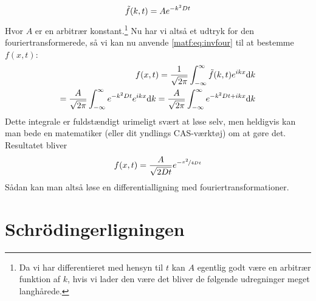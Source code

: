 \documentclass[crop=false, class=memoir]{standalone}
\begin{document}
\begin{align}
    \Tilde{f}(k,t) = Ae^{-k^2 D t}
\end{align}
Hvor $A$ er en arbitrær konstant.\footnote{Da vi har differentieret med hensyn til $t$ kan $A$ egentlig godt være en arbitrær funktion af $k$, hvis vi lader den være det bliver de følgende udregninger meget langhårede.} Nu har vi altså et udtryk for den fouriertransformerede, så vi kan nu anvende \cref{matf:eq:invfour} til at bestemme $f(x,t)$:
\begin{align}
    f(x,t) = \frac{1}{\sqrt{2\pi}}\int_{-\infty}^{\infty} \Tilde{f}(k,t) e^{ikx} \dd k \\
    = \frac{A}{\sqrt{2\pi}}\int_{-\infty}^{\infty} e^{-k^2 D t} e^{ikx} \dd k = \frac{A}{\sqrt{2\pi}}\int_{-\infty}^{\infty} e^{-k^2 D t + i k x} \dd k
\end{align}
Dette integrale er fuldstændigt urimeligt svært at løse selv, men heldigvis kan man bede en matematiker (eller dit yndlings CAS-værktøj) om at gøre det. Resultatet bliver
\begin{align}
    f(x,t) = \frac{A}{\sqrt{2D t}}e^{-\nicefrac{x^2}{4Dt}}
\end{align}
Sådan kan man altså løse en differentialligning med fouriertransformationer. 

\section{Schrödingerligningen}
\end{document}
